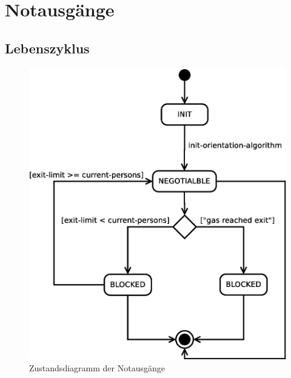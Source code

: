 \section{Notausgänge}
\label{sec:notausgaenge}

\subsection{Lebenszyklus}


\begin{figure}
\centering
\includegraphics[height=0.6\textwidth]{simulationsumgebung/exit.eps}
\caption{Zustandsdiagramm der Notausgänge}
\label{fig:exit}
\end{figure}

%
%
%
%
%
%
%
%

